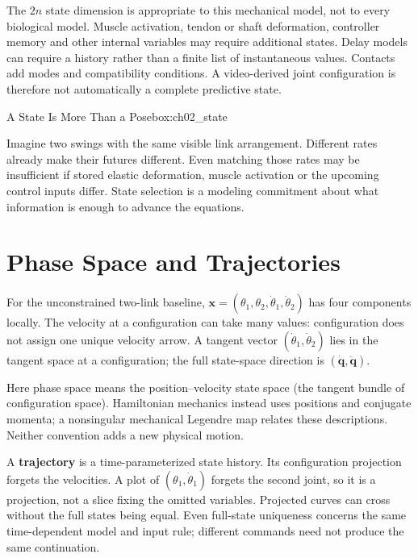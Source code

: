 The \(2n\) state dimension is appropriate to this mechanical model, not to every biological model. Muscle activation, tendon or shaft deformation, controller memory and other internal variables may require additional states. Delay models can require a history rather than a finite list of instantaneous values. Contacts add modes and compatibility conditions. A video-derived joint configuration is therefore not automatically a complete predictive state.

\begin{laymansbox}{A State Is More Than a Pose}{box:ch02_state}

Imagine two swings with the same visible link arrangement. Different rates already make their futures different. Even matching those rates may be insufficient if stored elastic deformation, muscle activation or the upcoming control inputs differ. State selection is a modeling commitment about what information is enough to advance the equations.

\end{laymansbox}

\section{Phase Space and Trajectories}\label{ch02:phase-space-and-trajectories}

\protect{}\label{ch02:phase-space-where-every-swing-lives}{}

For the unconstrained two-link baseline, \(\bm x=(\theta_1,\theta_2,\dot\theta_1,\dot\theta_2)\) has four components locally. The velocity at a configuration can take many values: configuration does not assign one unique velocity arrow. A tangent vector \((\dot\theta_1,\dot\theta_2)\) lies in the tangent space at a configuration; the full state-space direction is \((\dot{\bm q},\ddot{\bm q})\).

Here phase space means the position--velocity state space (the tangent bundle of configuration space). Hamiltonian mechanics instead uses positions and conjugate momenta; a nonsingular mechanical Legendre map relates these descriptions. Neither convention adds a new physical motion.

A \textbf{trajectory} is a time-parameterized state history. Its configuration projection forgets the velocities. A plot of \((\theta_1,\dot\theta_1)\) forgets the second joint, so it is a projection, not a slice fixing the omitted variables. Projected curves can cross without the full states being equal. Even full-state uniqueness concerns the same time-dependent model and input rule; different commands need not produce the same continuation.

